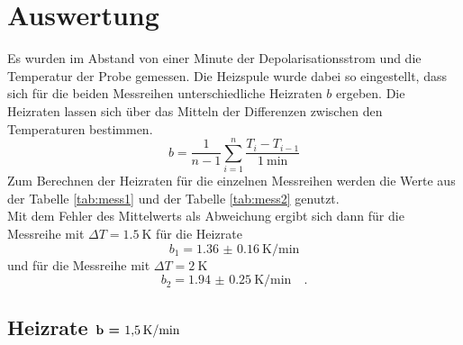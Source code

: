 \newpage 
\section{Auswertung}

\noindent Es wurden im Abstand von einer Minute der Depolarisationsstrom und die Temperatur der Probe gemessen.
Die Heizspule wurde dabei so eingestellt, dass sich für die beiden Messreihen unterschiedliche Heizraten $b$ ergeben.
Die Heizraten lassen sich über das Mitteln der Differenzen zwischen den Temperaturen bestimmen.\\
\begin{equation*}
  b = \frac{1}{n-1} \sum_{i=1}^{n} \frac{T_i - T_{i-1}}{\SI{1}{\minute}}
\end{equation*}
Zum Berechnen der Heizraten für die einzelnen Messreihen werden die Werte aus der Tabelle \ref{tab:mess1} und der Tabelle \ref{tab:mess2} genutzt.\\
Mit dem Fehler des Mittelwerts als Abweichung ergibt sich dann für die Messreihe mit $\Delta T = \SI{1.5}{\kelvin}$ für die Heizrate
\begin{equation*}
  b_1 = \SI{1.36(016)}{\kelvin\per\minute}
\end{equation*}
und für die Messreihe mit $\Delta T = \SI{2}{\kelvin}$ 
\begin{equation*}
  b_2 = \SI{1.94(025)}{\kelvin\per\minute} \quad .
\end{equation*}

\subsection{Heizrate $\textbf{b = \SI{1.5}{\kelvin\per\minute}}$}
\label{sec:15}

